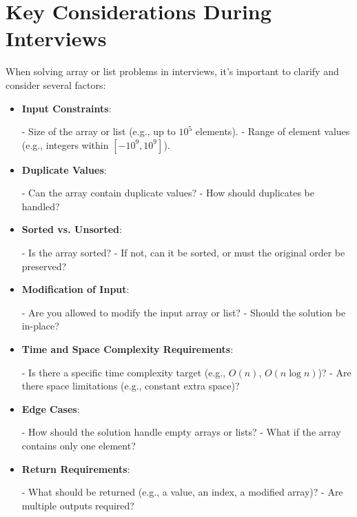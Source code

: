 \section{Key Considerations During Interviews}\label{sec:interview_considerations}

When solving array or list problems in interviews, it's important to clarify and consider several factors:

\begin{itemize}
    \item \textbf{Input Constraints}:

    - Size of the array or list (e.g., up to \(10^5\) elements).
    - Range of element values (e.g., integers within \([-10^9, 10^9]\)).

    \item \textbf{Duplicate Values}:

    - Can the array contain duplicate values?
    - How should duplicates be handled?

    \item \textbf{Sorted vs. Unsorted}:

    - Is the array sorted?
    - If not, can it be sorted, or must the original order be preserved?

    \item \textbf{Modification of Input}:

    - Are you allowed to modify the input array or list?
    - Should the solution be in-place?

    \item \textbf{Time and Space Complexity Requirements}:

    - Is there a specific time complexity target (e.g., \(O(n)\), \(O(n \log n)\))?
    - Are there space limitations (e.g., constant extra space)?

    \item \textbf{Edge Cases}:

    - How should the solution handle empty arrays or lists?
    - What if the array contains only one element?

    \item \textbf{Return Requirements}:

    - What should be returned (e.g., a value, an index, a modified array)?
    - Are multiple outputs required?

\end{itemize}

